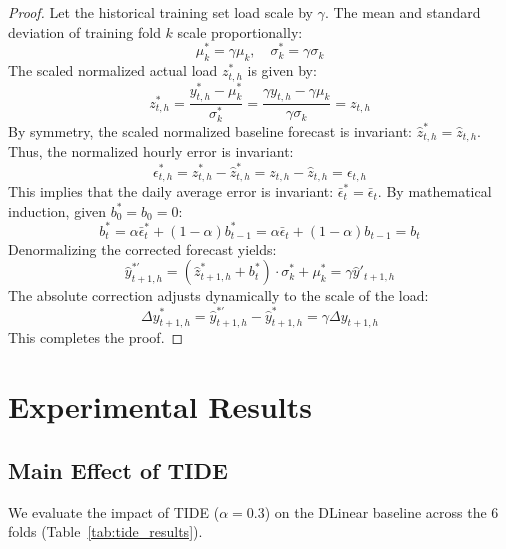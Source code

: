 \documentclass[10pt,twocolumn,letterpaper]{article}
\begin{document}
\begin{proof}
Let the historical training set load scale by $\gamma$. The mean and standard deviation of training fold $k$ scale proportionally:
\begin{equation}
\mu_k^* = \gamma \mu_k, \quad \sigma_k^* = \gamma \sigma_k
\end{equation}
The scaled normalized actual load $z^*_{t,h}$ is given by:
\begin{equation}
z^*_{t,h} = \frac{y^*_{t,h} - \mu_k^*}{\sigma_k^*} = \frac{\gamma y_{t,h} - \gamma \mu_k}{\gamma \sigma_k} = z_{t,h}
\end{equation}
By symmetry, the scaled normalized baseline forecast is invariant: $\hat{z}^*_{t,h} = \hat{z}_{t,h}$. 
Thus, the normalized hourly error is invariant:
\begin{equation}
\epsilon^*_{t,h} = z^*_{t,h} - \hat{z}^*_{t,h} = z_{t,h} - \hat{z}_{t,h} = \epsilon_{t,h}
\end{equation}
This implies that the daily average error is invariant: $\bar{\epsilon}^*_t = \bar{\epsilon}_t$. By mathematical induction, given $b_0^* = b_0 = 0$:
\begin{equation}
b^*_t = \alpha \bar{\epsilon}^*_t + (1 - \alpha) b^*_{t-1} = \alpha \bar{\epsilon}_t + (1 - \alpha) b_{t-1} = b_t
\end{equation}
Denormalizing the corrected forecast yields:
\begin{equation}
\hat{y}^{*'}_{t+1,h} = (\hat{z}^*_{t+1,h} + b^*_t) \cdot \sigma_k^* + \mu_k^* = \gamma \hat{y}'_{t+1,h}
\end{equation}
The absolute correction adjusts dynamically to the scale of the load:
\begin{equation}
\Delta y^*_{t+1,h} = \hat{y}^{*'}_{t+1,h} - \hat{y}^*_{t+1,h} = \gamma \Delta y_{t+1,h}
\end{equation}
This completes the proof.
\end{proof}

\section{Experimental Results}
\label{sec:experiments}

\subsection{Main Effect of TIDE}
We evaluate the impact of TIDE ($\alpha = 0.3$) on the DLinear baseline across the 6 folds (Table~\ref{tab:tide_results}).
\end{document}
